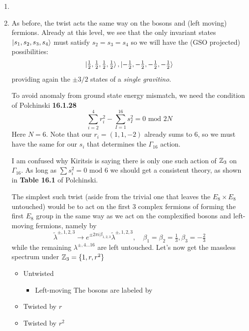 \documentclass[11pt, class=article, crop=false]{standalone}
\begin{document}
\begin{enumerate}
	\item 
	
	\item As before, the twist acts the same way on the bosons and (left moving) fermions. Already at this level, we see that the only invariant states $\ket{s_1, s_2, s_3, s_4}$ must satisfy $s_2 = s_3 = s_4$ so we will have the (GSO projected) possibilities:
	\[
		\ket{\tfrac12, \tfrac12, \tfrac12, \tfrac12}, \ket{-\tfrac12, -\tfrac12, -\tfrac12, -\tfrac12}
	\]
	providing again the $\pm 3/2$ states of a \emph{single gravitino}.
	
	To avoid anomaly from ground state energy mismatch, we need the condition of Polchinski \textbf{16.1.28}
	\[
		\sum_{i=2}^4 r_i^2 - \sum_{I=1}^{16} s_I^2 = 0 \text{ mod } 2N
	\]
	Here $N = 6$. Note that our $r_i = (1,1,-2)$ already sums to $6$, so we must have the same for our $s_i$ that determines the $\Gamma_{16}$ action. 
	
	I am confused why Kiritsis is saying there is only one such action of $\mathbb{Z}_3$ on $\Gamma_{16}$. As long as $\sum s_i^2= 0 \text{ mod } 6$ we should get a consistent theory, as shown in \textbf{Table 16.1} of Polchinski. 
	
	The simplest such twist (aside from the trivial one that leaves the $E_8 \times E_8$ untouched) would be to act on the first 3 complex fermions of forming the first $E_8$ group in the same way as we act on the complexified bosons and left-moving fermions, namely by
	\[
		\tilde \lambda^{\pm, 1,2,3} \to e^{\pm 2\pi i \beta_{1,2,3}} \tilde \lambda^{\pm, 1,2,3}, \quad \beta_1 = \beta_2 = \tfrac13, \beta_3 = -\tfrac23
	\]
	while the remaining $\lambda^{\pm, 4\dots 16}$ are left untouched. Let's now get the massless spectrum under $\mathbb{Z}_3 = \{1, r, r^2\}$
	\begin{itemize}
		\item Untwisted
		\begin{itemize}
			 \item Left-moving
			 The bosons are labeled by
		\end{itemize}
			
			
			
		
		\item Twisted by $r$
		
		\item Twisted by $r^2$
	\end{itemize}
	

\end{enumerate}
\end{document}

